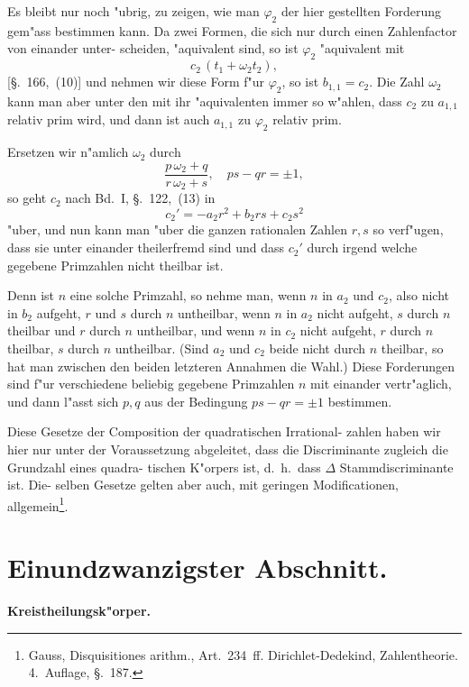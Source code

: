 \documentclass[12pt,a4paper]{article}
\theoremstyle{weber}
\begin{document}
Es bleibt nur noch "ubrig, zu zeigen, wie man $\varphi_2$ der hier
gestellten Forderung gem"ass bestimmen kann. Da zwei Formen,
die sich nur durch einen Zahlenfactor von einander unter-
scheiden, "aquivalent sind, so ist $\varphi_2$ "aquivalent mit
\[
c_2\,(t_1 + \omega_2t_2),
\]
[\S.~166,~(10)] und nehmen wir diese Form f"ur $\varphi_2$, so ist $b_{1,1} = c_2$.
Die Zahl $\omega_2$ kann man aber unter den mit ihr "aquivalenten
immer so w"ahlen, dass $c_2$ zu $a_{1,1}$ relativ prim wird, und dann ist
auch $a_{1,1}$ zu $\varphi_2$ relativ prim.

Ersetzen wir n"amlich $\omega_2$ durch
\[
\frac{p\,\omega_2 + q}{r\,\omega_2 + s}, \quad ps - qr = \pm 1,
\]
so geht $c_2$ nach Bd.~I, \S.~122,~(13) in
\[
c_2' = -a_2r^2 + b_2rs + c_2s^2
\]
"uber, und nun kann man "uber die ganzen rationalen Zahlen $r,s$
so verf"ugen, dass sie unter einander theilerfremd sind und dass
$c_2'$ durch irgend welche gegebene Primzahlen nicht theilbar ist.

Denn ist $n$ eine solche Primzahl, so nehme man, wenn $n$ in
$a_2$ und $c_2$, also nicht in $b_2$ aufgeht, $r$ und $s$ durch $n$ untheilbar,
wenn $n$ in $a_2$ nicht aufgeht, $s$ durch $n$ theilbar und $r$ durch $n$
untheilbar, und wenn $n$ in $c_2$ nicht aufgeht, $r$ durch $n$ theilbar,
$s$ durch $n$ untheilbar. (Sind $a_2$ und $c_2$ beide nicht durch $n$
theilbar, so hat man zwischen den beiden letzteren Annahmen
die Wahl.) Diese Forderungen sind f"ur verschiedene beliebig
gegebene Primzahlen $n$ mit einander vertr"aglich, und dann l"asst
sich $p, q$ aus der Bedingung $ps - qr = \pm 1$ bestimmen.

Diese Gesetze der Composition der quadratischen Irrational-
zahlen haben wir hier nur unter der Voraussetzung abgeleitet,
dass die Discriminante zugleich die Grundzahl eines quadra-
tischen K"orpers ist, d.~h.\ dass $\varDelta$ Stammdiscriminante ist. Die-
selben Gesetze gelten aber auch, mit geringen Modificationen,
allgemein\footnote{Gauss, Disquisitiones arithm., Art.~234~ff. Dirichlet-Dedekind,
Zahlentheorie. 4.~Auflage, \S.~187.}.

\newpage
\section*{Einundzwanzigster Abschnitt.}

\begin{center}
\Large\bfseries
Kreistheilungsk"orper.
\end{center}
\bigskip
\end{document}
